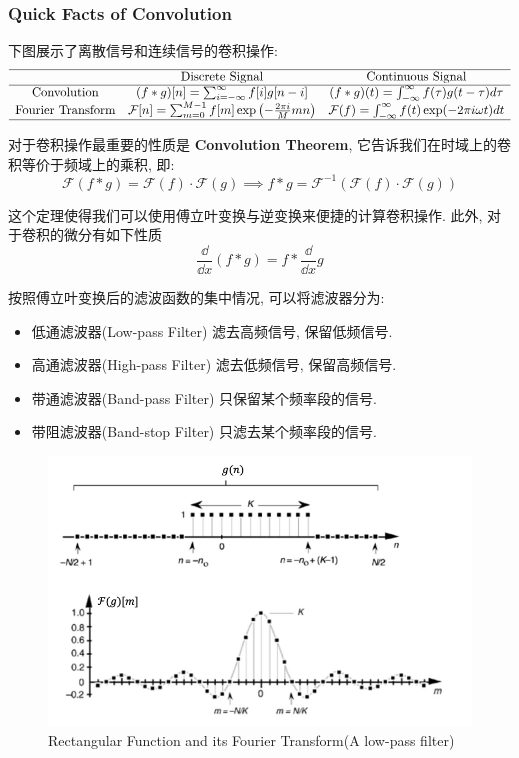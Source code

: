 \subsubsection{Quick Facts of Convolution}
下图展示了离散信号和连续信号的卷积操作:
\[
\begin{array}{ccc}
    \hline
    & \text{Discrete Signal} & \text{Continuous Signal} \\
    \hline
    \text{Convolution} & (f * g)[n] = \sum_{i = -\infty}^{\infty} f[i] g[n - i] & (f * g)(t) = \int_{-\infty}^{\infty} f(\tau) g(t - \tau) d\tau \\
    \text{Fourier Transform} & \mathcal{F}[n] = \sum_{m = 0}^{M-1} f[m] \exp\left( -\frac{2\pi i}{M} m n \right) & \mathcal{F}(f) = \int_{-\infty}^{\infty} f(t) \exp(-2\pi i \omega t) dt \\ 
    \hline
\end{array}
\]

对于卷积操作最重要的性质是 \textbf{Convolution Theorem}, 它告诉我们在时域上的卷积等价于频域上的乘积, 即:
\[
    \mathcal{F}(f * g) = \mathcal{F}(f) \cdot \mathcal{F}(g) \implies f * g = \mathcal{F}^{-1}(\mathcal{F}(f) \cdot \mathcal{F}(g))
\]

这个定理使得我们可以使用傅立叶变换与逆变换来便捷的计算卷积操作. 此外, 对于卷积的微分有如下性质
\[
    \frac{\dd }{\dd x} (f * g) = f * \frac{\dd }{\dd x} g
\]

按照傅立叶变换后的滤波函数的集中情况, 可以将滤波器分为:
\begin{itemize}
    \item 低通滤波器(Low-pass Filter) 滤去高频信号, 保留低频信号. 
    \item 高通滤波器(High-pass Filter) 滤去低频信号, 保留高频信号.
    \item 带通滤波器(Band-pass Filter) 只保留某个频率段的信号.
    \item 带阻滤波器(Band-stop Filter) 只滤去某个频率段的信号.
\end{itemize}
\begin{figure}[htbp]
    \centering
    \includegraphics[scale=0.75]{figures/Fourier.png}
    \caption{Rectangular Function and its Fourier Transform(A low-pass filter)}
\end{figure}


